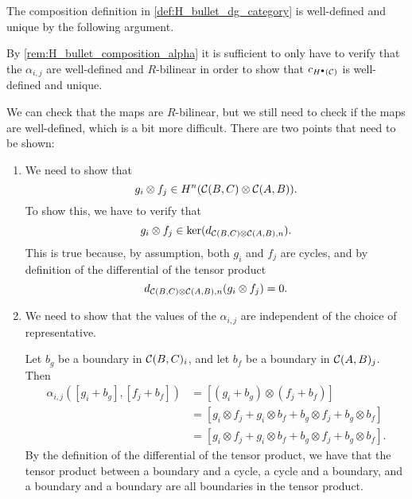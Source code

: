 \begin{remark}
    \label{rem:composition_in_H_bullet_is_well_defined}
    The composition definition in \autoref{def:H_bullet_dg_category} is well-defined and unique by the following argument.

    By \autoref{rem:H_bullet_composition_alpha} it is sufficient to only have to verify that the \( \alpha_{i, j} \) are well-defined and \( R \)-bilinear in order to show that \( c_{H^\bullet({\mathcal{C}})} \) is well-defined and unique.

    We can check that the maps are \( R \)-bilinear, but we still need to check if the maps are well-defined, which is a bit more difficult. There are two points that need to be shown:
    \begin{enumerate}
        \item {
            We need to show that
            \[
                g_i \otimes f_j \in H^n({\mathcal{C}}(B, C) \otimes {\mathcal{C}}(A, B)).
            \]
            To show this, we have to verify that
            \[
                g_i \otimes f_j \in \ker(d_{{\mathcal{C}}(B, C) \otimes {\mathcal{C}}(A, B), n}).
            \]
            This is true because, by assumption, both \( g_i \) and \( f_j \) are cycles, and by definition of the differential of the tensor product
            \[
                d_{{\mathcal{C}}(B, C) \otimes {\mathcal{C}}(A, B), n}(g_i \otimes f_j) = 0.
            \]
        }
        \item {
            We need to show that the values of the \( \alpha_{i, j} \) are independent of the choice of representative.

            Let \( b_g \) be a boundary in \( {\mathcal{C}}(B, C)_i \), and let \( b_f \) be a boundary in \( {\mathcal{C}}(A, B)_j \). Then
            \begin{align*}
                \alpha_{i, j}([g_i + b_g], [f_j + b_f]) &= [(g_i + b_g) \otimes (f_j + b_f)] \\
                &= [g_i \otimes f_j + g_i \otimes b_f + b_g \otimes f_j + b_g \otimes b_f] \\
                &= [g_i \otimes f_j + g_i \otimes b_f + b_g \otimes f_j + b_g \otimes b_f].
            \end{align*}
            By the definition of the differential of the tensor product, we have that the tensor product between a boundary and a cycle, a cycle and a boundary, and a boundary and a boundary are all boundaries in the tensor product.

}
\end{enumerate}
\end{remark}
